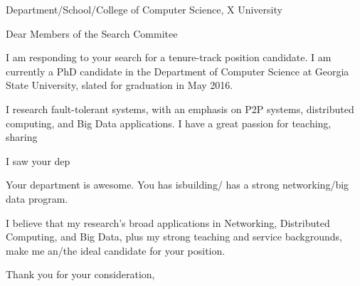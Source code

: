 \documentclass{letter}
\date{}
\begin{document}
 
\begin{letter}{Department/School/College of Computer Science, X University} 
\opening{Dear Members of the Search Commitee} 
 
I am responding to your search for a tenure-track position candidate.
I am currently a PhD candidate in the Department of Computer Science at Georgia State University, slated for graduation in May 2016.


I research fault-tolerant systems, with an emphasis  on P2P systems, distributed computing, and Big Data applications.
I have a great passion for teaching, sharing 

I saw your dep

Your department is awesome.
You has isbuilding/ has a strong networking/big data program.



I believe that my research's broad applications in Networking, Distributed Computing, and Big Data, plus my strong teaching and service backgrounds, make me an/the ideal candidate for your position.


\closing{Thank you for your consideration,} 
\end{letter} 
\end{document}
